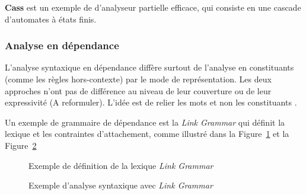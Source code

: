 \textbf{Cass} est un exemple de d'analyseur partielle efficace, qui consiste en une cascade d'automates à états finis.

\subsubsection{Analyse en dépendance}
L’analyse syntaxique en dépendance diffère surtout de l’analyse en constituants (comme les règles hors-contexte) par le mode de représentation. Les deux approches n’ont pas de différence au niveau de leur couverture ou de leur expressivité (A reformuler). L'idée est de relier les mots et non les constituants \citep{automatic-nlp}.

Un exemple de grammaire de dépendance est la \emph{Link Grammar} qui définit la lexique et les contraintes d'attachement, comme illustré dans la Figure~\ref{fig:link-grammar} et la Figure~\ref{fig:link-grammar-syntax}

\begin{figure}[htbp]
    \begin{center}
    \end{center}
    \caption{Exemple de définition de la lexique \emph{Link Grammar} \citep{automatic-nlp}}
    \label{fig:link-grammar}
\end{figure}

\begin{figure}[htbp]
    \begin{center}
    \end{center}
    \caption{Exemple d'analyse syntaxique avec \emph{Link Grammar} \citep{automatic-nlp}}
    \label{fig:link-grammar-syntax}
\end{figure}

